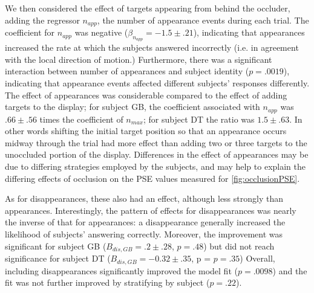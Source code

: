 \documentclass[../manuscript]{subfiles}
\begin{document}
We then considered the effect of targets appearing from behind the occluder, adding the regressor $n_{app}$, the number of appearance events during each trial. The coefficient for $n_{app}$ was negative ($\beta_{n_{app}} = -1.5 \pm .21$), indicating that appearances increased the rate at which the subjects answered incorrectly (i.e. in agreement with the local direction of motion.) Furthermore, there was a significant interaction  between number of appearances and subject identity (\ensuremath{p = .0019}), indicating that appearance events affected different subjects' responses differently. The effect of appearances was considerable compared to the effect of adding targets to the display; for subject GB, the coefficient associated with $n_{app}$ was $.66 \pm .56$ times the coefficient of $n_{max}$; for subject DT the ratio was $1.5 \pm .63$. In other words shifting the initial target position so that an appearance occurs midway through the trial had more effect than adding two or three targets to the unoccluded portion of the display. Differences in the effect of appearances may be due to differing strategies employed by the subjects, and may help to explain the differing effects of occlusion on the PSE values measured for \autoref{fig:occlusionPSE}.


As for disappearances, these also had an effect, although less strongly than appearances. Interestingly, the pattern of effects for disappearances was nearly the inverse of that for appearances: a disappearance generally increased the likelihood of subjects' answering correctly.  Moreover, the improvement was significant for subject GB ($B_{dis,GB} = .2 \pm .28$, \ensuremath{p = .48}) but did not reach significance for subject DT ($B_{dis,GB} = -0.32 \pm .35$, p = \ensuremath{p = .35}) Overall, including disappearances significantly improved the model fit (\ensuremath{p = .0098}) and the fit was not further improved by stratifying by  subject (\ensuremath{p = .22}).

\end{document}
